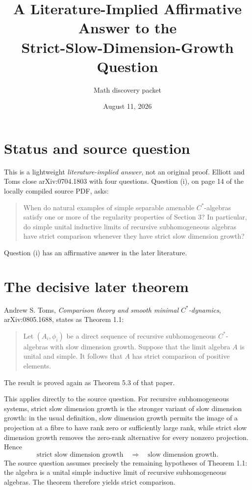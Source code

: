 \documentclass[11pt]{article}
\title{A Literature-Implied Affirmative Answer to the\\
Strict-Slow-Dimension-Growth Question}
\author{Math discovery packet}
\date{August 11, 2026}
\begin{document}
\maketitle

\section*{Status and source question}

This is a lightweight \emph{literature-implied answer}, not an original
proof.  Elliott and Toms close arXiv:0704.1803 with four questions.  Question
(i), on page 14 of the locally compiled source PDF, asks:
\begin{quote}
When do natural examples of simple separable amenable $C^*$-algebras satisfy
one or more of the regularity properties of Section 3?  In particular, do
simple unital inductive limits of recursive subhomogeneous algebras have
strict comparison whenever they have strict slow dimension growth?
\end{quote}

Question (i) has an affirmative answer in the later literature.

\section*{The decisive later theorem}

Andrew S. Toms, \emph{Comparison theory and smooth minimal
$C^*$-dynamics}, arXiv:0805.1688, states as Theorem 1.1:
\begin{quote}
Let $(A_i,\phi_i)$ be a direct sequence of recursive subhomogeneous
$C^*$-algebras with slow dimension growth.  Suppose that the limit algebra
$A$ is unital and simple.  It follows that $A$ has strict comparison of
positive elements.
\end{quote}
The result is proved again as Theorem 5.3 of that paper.

This applies directly to the source question.  For recursive subhomogeneous
systems, strict slow dimension growth is the stronger variant of slow
dimension growth: in the usual definition, slow dimension growth permits
the image of a projection at a fibre to have rank zero or sufficiently large
rank, while strict slow dimension growth removes the zero-rank alternative
for every nonzero projection.  Hence
\[
 \text{strict slow dimension growth}
 \quad\Longrightarrow\quad
 \text{slow dimension growth}.
\]
The source question assumes precisely the remaining hypotheses of Theorem
1.1: the algebra is a unital simple inductive limit of recursive
subhomogeneous algebras.  The theorem therefore yields strict comparison.
\end{document}
